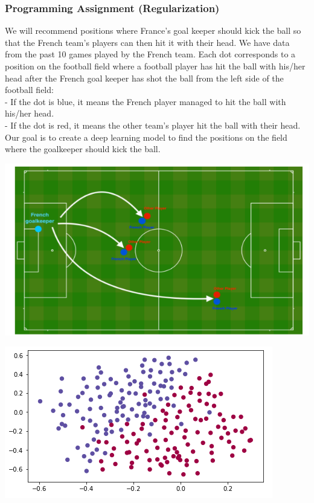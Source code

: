 \documentclass[11pt, a4paper]{article}
\begin{document}
\begin{spacing}{1.1}
	\subsubsection{Programming Assignment (Regularization)}
	We will recommend positions where France's goal keeper should kick the ball so that the French team's players can then hit it with their head. We have data from the past 10 games played by the French team. Each dot corresponds to a position on the football field where a football player has hit the ball with his/her head after the French goal keeper has shot the ball from the left side of the football field: \vspace*{1mm} \\
	\hspace*{3mm} - If the dot is blue, it means the French player managed to hit the ball with his/her head. \\
	\hspace*{3mm} - If the dot is red, it means the other team's player hit the ball with their head. \\
	Our goal is to create a deep learning model to find the positions on the field where the goalkeeper should kick the ball. \vspace*{1mm} \\
	\begin{minipage}[c]{8.5cm}
	\begin{center}\includegraphics[scale=0.4]{field} \end{center}
	\end{minipage}
	\begin{minipage}[c]{8.5cm}
	\begin{center}\includegraphics[scale=0.68]{field_graph} \end{center} 

\end{minipage}
\end{spacing}
\end{document}
